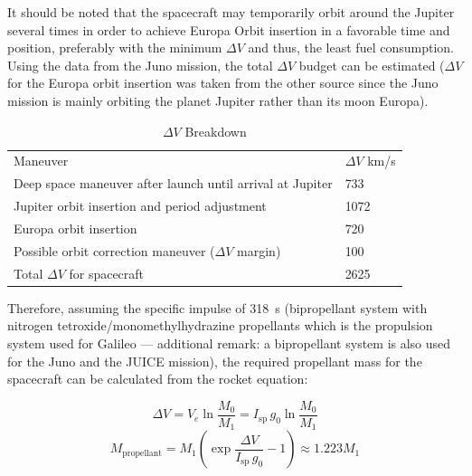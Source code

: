 It should be noted that the spacecraft may temporarily orbit around
the Jupiter several times in order to achieve Europa Orbit insertion
in a favorable time and position, preferably with the minimum
$\Delta V$ and thus, the least fuel consumption. Using the data from
the Juno mission, the total $\Delta V$ budget can be estimated
\cite{DMullerNet} ($\Delta V$ for the Europa orbit insertion was taken
from the other source since the Juno mission is mainly orbiting the
planet Jupiter rather than its moon Europa). \cite{TrajectoryDesign}

\begin{table}[H]
  \caption{$\Delta V$ Breakdown}
  \begin{tabular}{ll}
  Maneuver & $\Delta V$ \si{km/s} \\

  Deep space maneuver after launch until arrival at Jupiter & 733 \\

  Jupiter orbit insertion and period adjustment & 1072 \\

  Europa orbit insertion & 720 \\

  Possible orbit correction maneuver ($\Delta V$ margin) & 100 \\

  Total $\Delta V$ for spacecraft & 2625 \\
  \end{tabular}
\end{table}

Therefore, assuming the specific impulse of \SI{318}{s} (bipropellant
system with nitrogen tetroxide/monomethylhydrazine propellants which
is the propulsion system used for Galileo --- additional remark: a
bipropellant system is also used for the Juno and the JUICE
mission)\cite{Ampac}, the required propellant mass for the spacecraft
can be calculated from the rocket equation:

\begin{equation}
  \Delta V = V_e \ln \frac{M_0}{M_1}
  = I_{\mathrm{sp}} \, g_0 \ln \frac{M_0}{M_1}
\end{equation}
\begin{equation}
  M_{\mathrm{propellant}}
  = M_1 \left( \exp \frac{\Delta V}{I_{\mathrm{sp}} \, g_0} - 1 \right)
    \approx 1.223 M_1
\end{equation}
